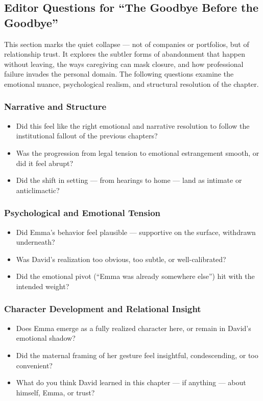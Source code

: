\subsection{Editor Questions for ``The Goodbye Before the Goodbye''}

This section marks the quiet collapse — not of companies or portfolios, but of relationship trust. It explores the subtler forms of abandonment that happen without leaving, the ways caregiving can mask closure, and how professional failure invades the personal domain. The following questions examine the emotional nuance, psychological realism, and structural resolution of the chapter.

\subsubsection{Narrative and Structure}

\begin{itemize}
  \item Did this feel like the right emotional and narrative resolution to follow the institutional fallout of the previous chapters?
  \item Was the progression from legal tension to emotional estrangement smooth, or did it feel abrupt?
  \item Did the shift in setting — from hearings to home — land as intimate or anticlimactic?
\end{itemize}

\subsubsection{Psychological and Emotional Tension}

\begin{itemize}
  \item Did Emma’s behavior feel plausible — supportive on the surface, withdrawn underneath?
  \item Was David’s realization too obvious, too subtle, or well-calibrated?
  \item Did the emotional pivot (“Emma was already somewhere else”) hit with the intended weight?
\end{itemize}

\subsubsection{Character Development and Relational Insight}

\begin{itemize}
  \item Does Emma emerge as a fully realized character here, or remain in David’s emotional shadow?
  \item Did the maternal framing of her gesture feel insightful, condescending, or too convenient?
  \item What do you think David learned in this chapter — if anything — about himself, Emma, or trust?
\end{itemize}

